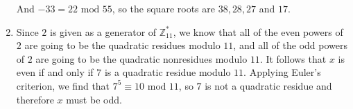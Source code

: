 \begin{enumerate}
And $-33 = 22 \textrm{ mod } 55$, so the square roots are $38, 28, 27$ and
$17$.

\item Since $2$ is given as a generator of $\mathbb{Z}_{11}^{*}$, we know that
all of the even powers of $2$ are going to be the quadratic residues modulo
$11$, and all of the odd powers of $2$ are going to be the quadratic nonresidues
modulo $11$. It follows that $x$ is even if and only if $7$ is a quadratic
residue modulo $11$. Applying Euler's criterion, we find that $7^5 \equiv 10
\textrm{ mod } 11$, so $7$ is not a quadratic residue and therefore $x$ must be
odd.

\end{enumerate}
